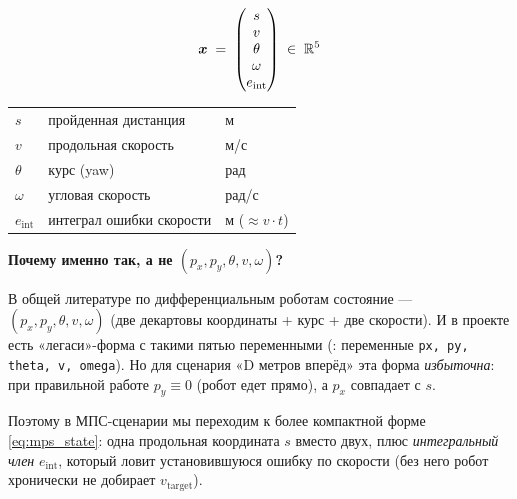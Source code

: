\begin{formulabox}[title={Канонический МПС-вектор состояния}]
\begin{equation}
  \bm{x} \;=\; \begin{pmatrix} s \\ v \\ \theta \\ \omega \\ e_\text{int} \end{pmatrix}
  \;\in\; \mathbb{R}^5
  \label{eq:mps_state}
\end{equation}

\begin{tabular}{lll}
\toprule
$s$           & пройденная дистанция         & м\\
$v$           & продольная скорость           & м/с\\
$\theta$      & курс (yaw)                    & рад\\
$\omega$      & угловая скорость              & рад/с\\
$e_\text{int}$& интеграл ошибки скорости      & м ($\approx v\cdot t$)\\
\bottomrule
\end{tabular}
\end{formulabox}

\begin{notebox}
\textbf{Почему именно так, а не $(p_x, p_y, \theta, v, \omega)$?}

В общей литературе по дифференциальным роботам состояние ---
$(p_x, p_y, \theta, v, \omega)$ (две декартовы координаты + курс +
две скорости). И в проекте есть «легаси»-форма с такими пятью переменными
(: переменные
\texttt{px, py, theta, v, omega}). Но для сценария «D метров вперёд»
эта форма \emph{избыточна}: при правильной работе $p_y \equiv 0$ (робот
едет прямо), а $p_x$ совпадает с $s$.

Поэтому в МПС-сценарии мы переходим к более компактной форме
\eqref{eq:mps_state}: одна продольная координата $s$ вместо двух,
плюс \emph{интегральный член} $e_\text{int}$, который ловит установившуюся
ошибку по скорости (без него робот хронически не добирает $v_\text{target}$).
\end{notebox}

